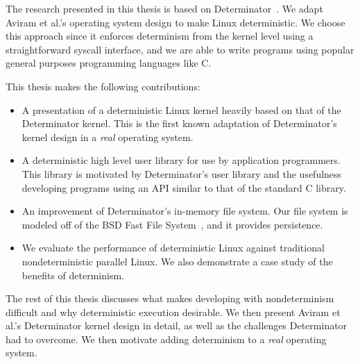 \iffalse
Techniques exist to provide benefits
in single areas, though these solutions do not "compose well with one another."
Determinism by itself provides benefits in all four areas. Thus, we have a
strong motivating factor for adding determinism to Linux.
\fi

The research presented in this thesis is based on Determinator~\cite{Aviram10}.
We adapt Aviram et al.'s operating system design to make Linux deterministic. We
choose this approach since it enforces determinism from the kernel level using a
straightforward syscall interface, and we are able to write programs using
popular general purposes programming languages like C.

This thesis makes the following contributions:

\begin{itemize}
    \item A presentation of a deterministic Linux kernel heavily based on that
    of the Determinator kernel. This is the first known adaptation of
    Determinator's kernel design in a \emph{real} operating system.
    \item A deterministic high level user library for use by application
    programmers. This library is motivated by Determinator's user library and
    the usefulness developing programs using an API similar to that of the
    standard C library.
    \item An improvement of Determinator's in-memory file system. Our file
    system is modeled off of the BSD Fast File System~\cite{mckusick1984fast},
    and it provides persistence.
    \item We evaluate the performance of deterministic Linux against traditional
    nondeterministic parallel Linux. We also demonstrate a case study of the
    benefits of determinism.
\end{itemize}

\iffalse
This thesis also presents an accompanying
user level C library, akin to the library utilities discussed by Aviram et al.
This user library is intended to simplify writing user programs in C using
familiar high level abstractions such as fork-join. We also provide an in memory
file system, improving upon Arivam et al.'s in memory file system design.
\fi

The rest of this thesis discusses what makes developing with nondeterminism
difficult and why deterministic execution desirable. We then present Aviram et
al.'s Determinator kernel design in detail, as well as the challenges
Determinator had to overcome. We then motivate adding determinism to a
\emph{real} operating system.

